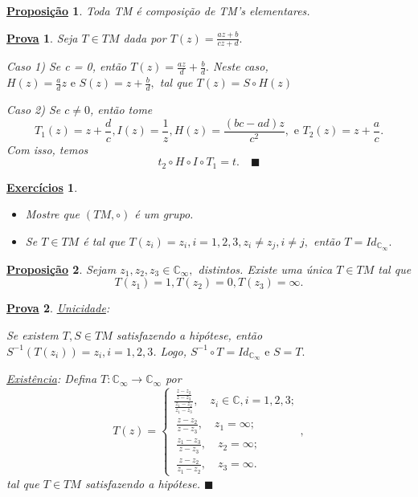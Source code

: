 \documentclass{article}
\newtheorem*{proof*}{\underline{Prova}}
\newtheorem*{prop*}{\underline{Proposi\c c\~ao}}
\newtheorem*{exer*}{\underline{Exerc\'icios}}
\renewcommand\qedsymbol{$\blacksquare$}
\begin{document}
  \begin{prop*}
    Toda TM \'e composi\c c\~ao de TM's elementares.
  \end{prop*}
  \begin{proof*}
    Seja $T\in{TM}$ dada por $T(z) = \displaystyle\frac{az + b}{cz + d}.$

    Caso 1) Se c = 0, ent\~ao $T(z) = \frac{az}{d} + \frac{b}{d}.$ Neste caso, $H(z) = \frac{a}{d}z \text{ e } S(z) = z + \frac{b}{d},$
    tal que $T(z) = S\circ{H(z)}$

    Caso 2) Se $c\neq0$, ent\~ao tome 
    $$
    T_1(z) = z + \frac{d}{c}, I(z) = \frac{1}{z}, H(z) = \frac{(bc - ad)z}{c^2}, \text{ e } T_2(z) = z + \frac{a}{c}.
    $$
    Com isso, temos 
    $$
    t_2\circ{H}\circ{I}\circ{T_1} = t. \quad \text{\qedsymbol}
    $$
  \end{proof*}
  \begin{exer*}
    \begin{itemize}
      \item[1)]Mostre que $(TM, \circ)$ \'e um grupo.
      \item[2)] Se $T\in{TM}$ \'e tal que $T(z_{i}) = z_{i}, i = 1, 2, 3, z_{i}\neq z_{j}, i\neq{j},$ ent\~ao $T = Id_{\mathbb{C}_{\infty}}.$
    \end{itemize}
  \end{exer*} 
  \begin{prop*}
    Sejam $z_1, z_2, z_3\in \mathbb{C}_{\infty}, $ distintos. Existe uma \'unica $T\in{TM}$ tal que
    $$
    T(z_1) = 1, T(z_2) = 0, T(z_3) = \infty.
    $$
  \end{prop*}
  \begin{proof*}
    \underline{Unicidade}: 

    Se existem $T, S\in{TM}$ satisfazendo a hip\'otese, ent\~ao $S^{-1}(T(z_i)) = z_{i}, i=1, 2, 3$. Logo, 
    $S^{-1}\circ{T} = Id_{\mathbb{C}_{\infty}} \text{ e } S = T.$

    \underline{Exist\^encia}: Defina $T:\mathbb{C}_{\infty}\rightarrow \mathbb{C}_{\infty}$ por 
    $$
    T(z) = \left\{\begin{array}{ll}
        \displaystyle\frac{\frac{z-z_2}{z-z_3}}{\frac{z_1-z_2}{z_1-z_3}}, \quad z_{i}\in \mathbb{C}, i=1, 2, 3; \\\
        \displaystyle\frac{z-z_2}{z-z_3}, \quad z_1 = \infty; \\\
        \displaystyle\frac{z_1 - z_3}{z - z_3}, \quad z_2 = \infty; \\\
        \displaystyle\frac{z - z_2}{z_1 - z_2}, \quad z_3 = \infty.
    \end{array}\right.,
    $$
    tal que $T\in{TM}$ satisfazendo a hip\'otese. \qedsymbol
  \end{proof*}
\end{document}
